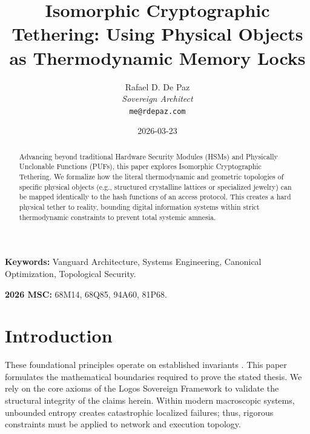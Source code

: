 \documentclass[12pt, a4paper]{article}
\theoremstyle{plain}
\theoremstyle{definition}
\begin{document}
\title{\textbf{
  Isomorphic Cryptographic Tethering: Using Physical Objects as Thermodynamic Memory Locks}}
\author{Rafael D. De Paz \\ \textit{Sovereign Architect} \\ \texttt{me@rdepaz.com}}
\date{2026-03-23}
\maketitle

\begin{abstract}
Advancing beyond traditional Hardware Security Modules (HSMs) and Physically Unclonable Functions (PUFs), this paper explores Isomorphic Cryptographic Tethering. We formalize how the literal thermodynamic and geometric topologies of specific physical objects (e.g., structured crystalline lattices or specialized jewelry) can be mapped identically to the hash functions of an access protocol. This creates a hard physical tether to reality, bounding digital information systems within strict thermodynamic constraints to prevent total systemic amnesia.
\end{abstract}

\vspace{1em}
\noindent\textbf{Keywords:} Vanguard Architecture, Systems Engineering, Canonical Optimization, Topological Security.

\vspace{0.5em}
\noindent\textbf{2026 MSC:} 68M14, 68Q85, 94A60, 81P68.

\section{Introduction}
These foundational principles operate on established invariants \cite{suh2007physical,pappu2002physical}.\label{sec:intro}
This paper formulates the mathematical boundaries required to prove the stated thesis. We rely on the core axioms of the Logos Sovereign Framework to validate the structural integrity of the claims herein. Within modern macroscopic systems, unbounded entropy creates catastrophic localized failures; thus, rigorous constraints must be applied to network and execution topology.

\end{document}
